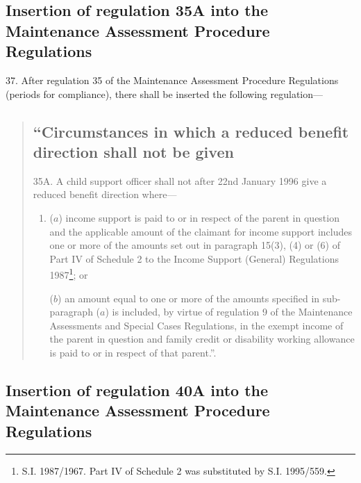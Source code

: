 \documentclass[12pt,a4paper]{article}
\begin{document}
\subsection[37. Insertion of regulation 35A into the Maintenance Assessment Procedure Regulations]{Insertion of regulation 35A into the Maintenance Assessment Procedure Regulations}

37.  After regulation 35 of the Maintenance Assessment Procedure Regulations (periods for compliance), there shall be inserted the following regulation—
\begin{quotation}
\subsection*{“Circumstances in which a reduced benefit direction shall not be given}

35A.  A child support officer shall not after 22nd January 1996 give a reduced benefit direction where—
\begin{enumerate}\item[]
($a$) income support is paid to or in respect of the parent in question and the applicable amount of the claimant for income support includes one or more of the amounts set out in paragraph 15(3), (4) or (6) of Part IV of Schedule 2 to the Income Support (General) Regulations 1987\footnote{\frenchspacing S.I. 1987/1967. Part IV of Schedule 2 was substituted by S.I. 1995/559.}; or

($b$) an amount equal to one or more of the amounts specified in sub-paragraph ($a$) is included, by virtue of regulation 9 of the Maintenance Assessments and Special Cases Regulations, in the exempt income of the parent in question and family credit or disability working allowance is paid to or in respect of that parent.”.
\end{enumerate}
\end{quotation}

\subsection[38. Insertion of regulation 40A into the Maintenance Assessment Procedure Regulations]{Insertion of regulation 40A into the Maintenance Assessment Procedure Regulations}
\end{document}
